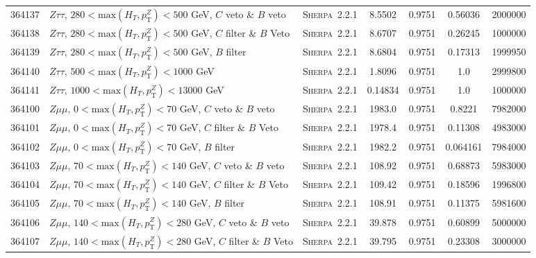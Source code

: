 \begin{table}[!htb]
{\begin{tabular}{|c|l|c|c|c|c|r|}
      364137 & $Z \tau\tau $, $280<\text{max}(H_T,p_{\text{T}}^Z)<500$ GeV, $C$ veto \& $B$ veto & \textsc{Sherpa}~2.2.1 &  8.5502       &0.9751 & 0.56036  &   2000000\\       
      364138 & $Z \tau\tau $, $280<\text{max}(H_T,p_{\text{T}}^Z)<500$ GeV, $C$ filter \& $B$ Veto & \textsc{Sherpa}~2.2.1 &8.6707       &0.9751 & 0.26245  &  1000000 \\       
      364139 & $Z \tau\tau $, $280<\text{max}(H_T,p_{\text{T}}^Z)<500$ GeV, $B$ filter & \textsc{Sherpa}~2.2.1 &            8.6804       &0.9751 & 0.17313  &   1999950\\       
      364140 & $Z \tau\tau $, $500<\text{max}(H_T,p_{\text{T}}^Z)<1000$ GeV                      & \textsc{Sherpa}~2.2.1 &  1.8096       &0.9751 & 1.0 	   &   2999800\\ 
      364141 & $Z \tau\tau $, $1000<\text{max}(H_T,p_{\text{T}}^Z)<13000$ GeV                    & \textsc{Sherpa}~2.2.1 &  0.14834      &0.9751 & 1.0 	   &   1000000\\ 
      \hline
      364100 & $Z \mu\mu $, $0<\text{max}(H_T,p_{\text{T}}^Z)<70$ GeV, $C$ veto \& $B$ veto & \textsc{Sherpa}~2.2.1 &       1983.0      & 0.9751& 0.8221  &  7982000\\
      364101 & $Z \mu\mu $, $0<\text{max}(H_T,p_{\text{T}}^Z)<70$ GeV, $C$ filter \& $B$ Veto & \textsc{Sherpa}~2.2.1 &     1978.4      & 0.9751& 0.11308 &  4983000\\
      364102 & $Z \mu\mu $, $0<\text{max}(H_T,p_{\text{T}}^Z)<70$ GeV, $B$ filter & \textsc{Sherpa}~2.2.1 &                 1982.2      & 0.9751& 0.064161&  7984000\\
      364103 & $Z \mu\mu $, $70<\text{max}(H_T,p_{\text{T}}^Z)<140$ GeV, $C$ veto \& $B$ veto & \textsc{Sherpa}~2.2.1 &     108.92      & 0.9751& 0.68873 &  5983000\\
      364104 & $Z \mu\mu $, $70<\text{max}(H_T,p_{\text{T}}^Z)<140$ GeV, $C$ filter \& $B$ Veto & \textsc{Sherpa}~2.2.1 &   109.42      & 0.9751& 0.18596 &  1996800\\
      364105 & $Z \mu\mu $, $70<\text{max}(H_T,p_{\text{T}}^Z)<140$ GeV, $B$ filter & \textsc{Sherpa}~2.2.1 &               108.91      & 0.9751& 0.11375 &  5981600\\
      364106 & $Z \mu\mu $, $140<\text{max}(H_T,p_{\text{T}}^Z)<280$ GeV, $C$ veto \& $B$ veto & \textsc{Sherpa}~2.2.1 &    39.878      & 0.9751& 0.60899 &  5000000\\
      364107 & $Z \mu\mu $, $140<\text{max}(H_T,p_{\text{T}}^Z)<280$ GeV, $C$ filter \& $B$ Veto & \textsc{Sherpa}~2.2.1 &  39.795      & 0.9751& 0.23308 &  3000000\\

\end{tabular}}
\end{table}
